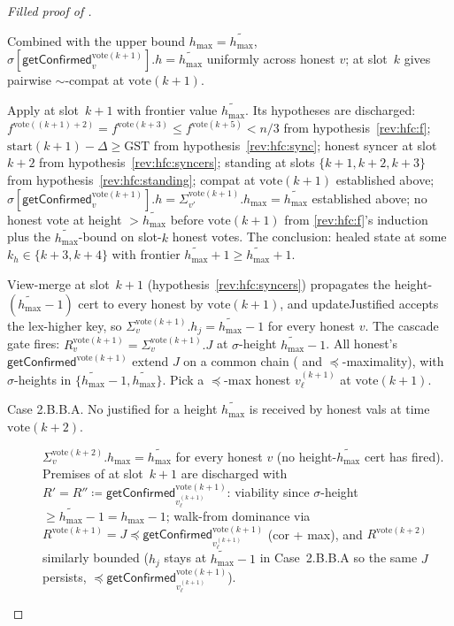 \documentclass{article}
\newcommand{\hmax}{\ensuremath{h_{\max}}\xspace}
\newcommand{\start}{\ensuremath{\mathrm{start}}}
\newcommand{\vote}{\ensuremath{\mathrm{vote}}}
\newcommand{\GST}{\ensuremath{\mathrm{GST}}\xspace}
\newcommand{\comm}[1]{\ensuremath{\widetilde{#1}}}
\newcommand{\updateJustified}{\textsf{updateJustified}\xspace}
\newcommand{\getConfirmed}{\textsf{getConfirmed}\xspace}
\theoremstyle{plain}
\theoremstyle{definition}
\theoremstyle{remark}
\begin{document}
\begin{proof}[Filled proof of ]
\begin{description}[style=nextline]
\begin{description}[style=nextline]
\begin{description}[style=nextline]
        Combined with the upper bound $\hmax = \comm{\hmax}$, $\sigma[\getConfirmed_v^{\vote(k+1)}].h = \comm{\hmax}$ uniformly across honest $v$;
         at slot~$k$ gives pairwise $\sim$-compat at $\vote(k+1)$.

        Apply  at slot~$k+1$ with frontier value $\comm{\hmax}$.
        Its hypotheses are discharged: $f^{\vote((k+1)+2)} = f^{\vote(k+3)} \leq f^{\vote(k+5)} < n/3$ from hypothesis~\ref{rev:hfc:f};
        $\start(k+1) - \Delta \geq \GST$ from hypothesis~\ref{rev:hfc:sync};
        honest syncer at slot~$k+2$ from hypothesis~\ref{rev:hfc:syncers};
        standing at slots $\{k+1, k+2, k+3\}$ from hypothesis~\ref{rev:hfc:standing};
        compat at $\vote(k+1)$ established above;
        $\sigma[\getConfirmed_v^{\vote(k+1)}].h = \Sigma_{v'}^{\vote(k+1)}.\hmax = \comm{\hmax}$ established above;
        no honest vote at height $> \comm{\hmax}$ before $\vote(k+1)$ from \ref{rev:hfc:f}'s induction plus the $\comm{\hmax}$-bound on slot-$k$ honest votes.
        The conclusion: healed state at some $k_h \in \{k+3, k+4\}$ with frontier $\comm{\hmax}+1 \geq \comm{\hmax}+1$.

      \item[Case 2.B.B. A justified for a height $\comm{\hmax}-1$ is received by honest vals at time $\vote(k+1)$.]
        View-merge at slot~$k+1$ (hypothesis~\ref{rev:hfc:syncers}) propagates the height-$(\comm{\hmax}-1)$ cert to every honest by $\vote(k+1)$, and \updateJustified{} accepts the lex-higher key, so $\Sigma_v^{\vote(k+1)}.h_j = \comm{\hmax}-1$ for every honest $v$.
        The cascade gate fires: $R_v^{\vote(k+1)} = \Sigma_v^{\vote(k+1)}.J$ at $\sigma$-height $\comm{\hmax}-1$.
        All honest's $\getConfirmed^{\vote(k+1)}$ extend $J$ on a common chain ( and $\preceq$-maximality), with $\sigma$-heights in $\{\comm{\hmax}-1, \comm{\hmax}\}$.
        Pick a $\preceq$-max honest $v_\ell^{(k+1)}$ at $\vote(k+1)$.

        \begin{description}
          \item[Case 2.B.B.A. No justified for a height $\comm{\hmax}$ is received by honest vals at time $\vote(k+2)$.]
            $\Sigma_v^{\vote(k+2)}.\hmax = \comm{\hmax}$ for every honest $v$ (no height-$\comm{\hmax}$ cert has fired).
            Premises of  at slot~$k+1$ are discharged with $R' = R'' \coloneqq \getConfirmed_{v_\ell^{(k+1)}}^{\vote(k+1)}$:
            viability since $\sigma$-height $\geq \comm{\hmax}-1 = \hmax-1$;
            walk-from dominance via $R^{\vote(k+1)} = J \preceq \getConfirmed_{v_\ell^{(k+1)}}^{\vote(k+1)}$ (cor + max), and $R^{\vote(k+2)}$ similarly bounded ($h_j$ stays at $\comm{\hmax}-1$ in Case~2.B.B.A so the same $J$ persists, $\preceq \getConfirmed_{v_\ell^{(k+1)}}^{\vote(k+1)}$).


\end{description}
\end{description}
\end{description}
\end{description}
\end{proof}
\end{document}
